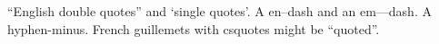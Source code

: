 \documentclass{article}
\begin{document}
``English double quotes'' and `single quotes'. A en--dash and an em---dash. A hyphen-minus.
French guillemets with csquotes might be \enquote{quoted}.
\end{document}

